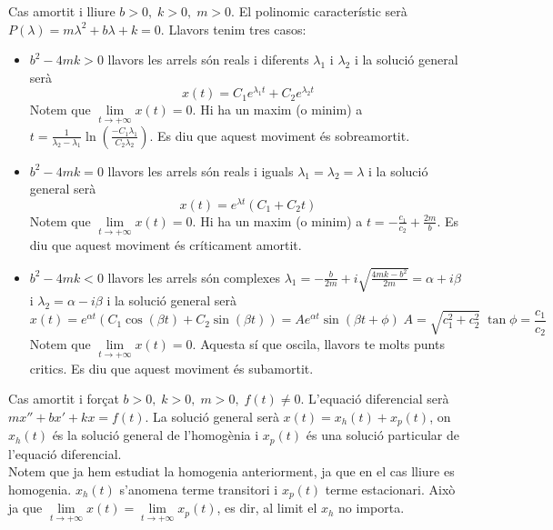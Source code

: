 \documentclass[../main.tex]{subfiles}
\begin{document}
Cas amortit i lliure $b>0,\;k>0,\;m>0$. El polinomic característic serà $P(\lambda) = m\lambda^2 + b\lambda + k = 0$. Llavors tenim tres casos:
\begin{itemize}
	\item $b^2 - 4mk > 0$ llavors les arrels són reals i diferents $\lambda_1$ i $\lambda_2$ i la solució general serà
		\begin{displaymath}
			x(t) = C_1e^{\lambda_1t} + C_2e^{\lambda_2t}
		\end{displaymath}
		Notem que $\lim\limits_{t\to+\infty} x(t) = 0$. Hi ha un maxim (o minim) a $t = \frac{1}{\lambda_2-\lambda_1}\ln{\left(\frac{-C_1\lambda_1}{C_2\lambda_2}\right)}$. Es diu que aquest moviment és sobreamortit.
	\item $b^2 - 4mk = 0$ llavors les arrels són reals i iguals $\lambda_1 = \lambda_2 = \lambda$ i la solució general serà
		\begin{displaymath}
			x(t) = e^{\lambda t}(C_1 + C_2t)
		\end{displaymath}
		Notem que $\lim\limits_{t\to+\infty} x(t) = 0$. Hi ha un maxim (o minim) a $t = -\frac{c_1}{c_2} + \frac{2m}{b}$. Es diu que aquest moviment és críticament amortit.
	\item $b^2 - 4mk < 0$ llavors les arrels són complexes $\lambda_1 = -\frac{b}{2m} + i\sqrt{\frac{4mk-b^2}{2m}} = \alpha + i\beta$ i $\lambda_2 = \alpha - i\beta$ i la solució general serà
		\begin{displaymath}
			x(t) = e^{\alpha t}(C_1\cos(\beta t) + C_2\sin(\beta t)) = Ae^{\alpha t}\sin(\beta t + \phi)\; A = \sqrt{c_1^2+c_2^2}\; \tan{\phi} = \frac{c_1}{c_2}
		\end{displaymath}
		Notem que $\lim\limits_{t\to+\infty} x(t) = 0$. Aquesta sí que oscila, llavors te molts punts critics. Es diu que aquest moviment és subamortit.
\end{itemize}

Cas amortit i forçat $b>0,\;k>0,\;m>0,\;f(t)\neq 0$. L'equació diferencial serà $mx'' + bx' + kx = f(t)$. La solució general serà $x(t) = x_h(t) + x_p(t)$, on $x_h(t)$ és la solució general de l'homogènia i $x_p(t)$ és una solució particular de l'equació diferencial.\\
Notem que ja hem estudiat la homogenia anteriorment, ja que en el cas lliure es homogenia. $x_h(t)$ s'anomena terme transitori i $x_p(t)$ terme estacionari. Això ja que $\lim\limits_{t \to +\infty} x(t) = \lim\limits_{t\to+\infty} x_p(t)$, es dir, al limit el $x_h$ no importa.\\
\end{document}
